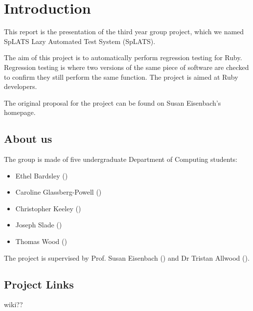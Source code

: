 \chapter{Introduction}

This report is the presentation of the third year group project, which we named SpLATS Lazy Automated Test System (SpLATS).

The aim of this project is to automatically perform regression testing for Ruby.
Regression testing is where two versions of the same piece of software are checked to confirm they still perform the same function.
The project is aimed at Ruby developers.

The original proposal for the project can be found on Susan Eisenbach's homepage.

\section{About us}
  The group is made of five undergraduate Department of Computing students:
  \begin{itemize}
    \item{Ethel Bardsley ()}
    \item{Caroline Glassberg-Powell ()}
    \item{Christopher Keeley ()}
    \item{Joseph Slade ()}
    \item{Thomas Wood ()}
  \end{itemize}

  The project is supervised by Prof. Susan Eisenbach () and Dr Tristan Allwood ().

\section{Project Links}
  wiki??
